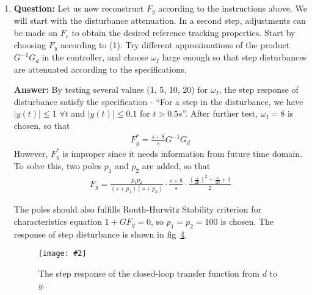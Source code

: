 \documentclass[11pt,a4paper]{article}
\newcommand{\image}[3]{
	\begin{figure}[!ht]
		\centering
	    \texttt{[image: \#2]}
		\caption{#3}
		\label{fig:#2}
	\end{figure}
}
\begin{document}
\begin{enumerate}[(1)]
	\begin{align*}
		s^{4} + (2p+1)s^{3} + (2p+p^{2})s^{2} + p^{2}(w_{c}+1)s + p^{2}w_{c} = 0
	\end{align*}
	\par To make the system stable, the poles in the characteristics equation should be in the LHP. To satisfy such requirement, Routh-Hurwitz Stability Criterion is used to test the stability and find possible value for $p$. Thus, a sufficient condition is that $p$ should be positive and large enough. However if the value of poles added is too large, the step response would be too rapid and the amplitude of step response would also be too large. $p=100$ is finally chosen as a decision of the trade-off. The bode plot of the open-loop transfer function, the closed-loop transfer function and the step response of the closed-loop transfer function are illustrated in fig~\ref{fig:421_L}, \ref{fig:421_Gdcl}, and \ref{fig:421_Gdcl_Step}.
	\image{0.7}{421_L}{Bode plot of the open-loop transfer function.}
	\image{0.7}{421_Gdcl}{Bode plot of the closed-loop transfer function.}
	\image{0.7}{421_Gdcl_Step}{The step response of the closed-loop transfer function from $d$ to $y$.}
	
	\item \textbf{Question:} Let us now reconstruct $F_{y}$ according to the instructions above. We will start with the disturbance attenuation. In a second step, adjustments can be made on $F_{r}$ to obtain the desired reference tracking properties. Start by choosing $F_{y}$ according to (1). Try different approximations of the product $G^{-1}G_{d}$ in the controller, and choose $\omega_{I}$ large enough so that step disturbances are attenuated according to the specifications.
	\par \textbf{Answer:} By testing several values (1, 5, 10, 20) for $\omega_{I}$, the step response of disturbance satisfy the specification - ``For a step in the disturbance, we have $|y(t)| \leq 1$ $\forall t$ and $|y(t)| \leq 0.1$ for $t > 0.5 s$''. After further test, $\omega_{I} = 8$ is chosen, so that
	\begin{align*}
		F_{y}^{*} = \frac{s + 8}{s}G^{-1}G_{d}
	\end{align*}
	However, $F^{*}_{y}$ is improper since it needs information from future time domain. To solve this, two poles $p_{1}$ and $p_{2}$ are added, so that
	\begin{align*}
		F_{y} = \frac{p_{1}p_{2}}{(s+p_{1})(s+p_{2})}\cdot\frac{s + 8}{s}\cdot\frac{(\frac{s}{20})^2+\frac{s}{20}+1}{2}
	\end{align*}
	\par The poles should also fulfills Routh-Hurwitz Stability criterion for characteristics equation $1+GF_{y}=0$, so $p_1=p_2=100$ is chosen. The response of step disturbance is shown in fig~\ref{fig:422_Gdcl_Step}.
	\image{0.7}{422_Gdcl_Step}{The step response of the closed-loop transfer function from $d$ to $y$.}
	

\end{enumerate}
\end{document}

